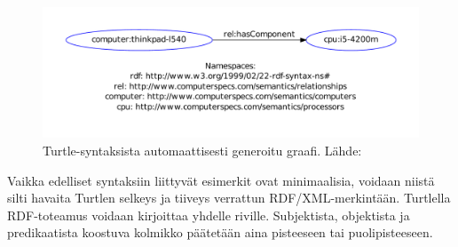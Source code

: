\documentclass[finnish, 12pt, a4paper, elec, utf8, pdfa, online]{aaltothesis}
\begin{document}
\begin{figure}[htb]
\centering
\includegraphics[width=15cm]{images/RDF-triplet2.pdf}
\vspace{-3pc}
\caption{Turtle-syntaksista automaattisesti generoitu graafi. Lähde: \cite{SeCo_RDF_validator} \label{images/RDF-triplet2}}
\end{figure}

Vaikka edelliset syntaksiin liittyvät esimerkit ovat minimaalisia, voidaan niistä silti havaita Turtlen selkeys ja tiiveys verrattun RDF/XML-merkintään. Turtlella RDF-toteamus voidaan kirjoittaa yhdelle riville. Subjektista, objektista ja predikaatista koostuva kolmikko päätetään aina pisteeseen tai puolipisteeseen.
\end{document}

